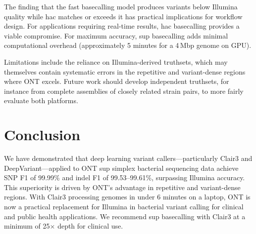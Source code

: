 \documentclass[11pt]{article}
\begin{document}
The finding that the fast basecalling model produces variants below Illumina quality while hac matches or exceeds it has practical implications for workflow design. For applications requiring real-time results, hac basecalling provides a viable compromise. For maximum accuracy, sup basecalling adds minimal computational overhead (approximately 5 minutes for a 4\,Mbp genome on GPU).

Limitations include the reliance on Illumina-derived truthsets, which may themselves contain systematic errors in the repetitive and variant-dense regions where ONT excels. Future work should develop independent truthsets, for instance from complete assemblies of closely related strain pairs, to more fairly evaluate both platforms.

\section{Conclusion}

We have demonstrated that deep learning variant callers---particularly Clair3 and DeepVariant---applied to ONT sup simplex bacterial sequencing data achieve SNP F1 of 99.99\% and indel F1 of 99.53--99.61\%, surpassing Illumina accuracy. This superiority is driven by ONT's advantage in repetitive and variant-dense regions. With Clair3 processing genomes in under 6 minutes on a laptop, ONT is now a practical replacement for Illumina in bacterial variant calling for clinical and public health applications. We recommend sup basecalling with Clair3 at a minimum of 25$\times$ depth for clinical use.



\end{document}
